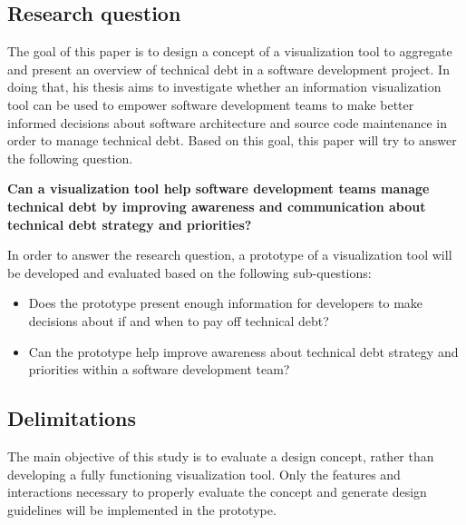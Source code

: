 \subsection{Research question}

The goal of this paper is to design a concept of a visualization tool to aggregate and present an overview of technical debt in a software development project.
In doing that, his thesis aims to investigate whether an information visualization tool can be used to empower software development teams to make better informed decisions about software architecture and source code maintenance in order to manage technical debt.
Based on this goal, this paper will try to answer the following question.

\smallskip
\textbf{
Can a visualization tool help software development teams manage technical debt by improving awareness and communication about technical debt strategy and priorities?
}
\smallskip

In order to answer the research question, a prototype of a visualization tool will be developed and evaluated based on the following sub-questions:
\begin{itemize}
\item Does the prototype present enough information for developers to make decisions about if and when to pay off technical debt?
\item Can the prototype help improve awareness about technical debt strategy and priorities within a software development team?
\end{itemize}

\subsection{Delimitations}
The main objective of this study is to evaluate a design concept, rather than developing a fully functioning visualization tool.
Only the features and interactions necessary to properly evaluate the concept and generate design guidelines will be implemented in the prototype.